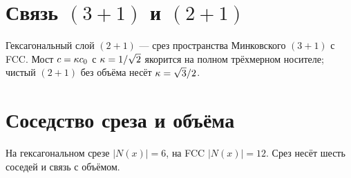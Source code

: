 \section{Связь $(3{+}1)$ и $(2{+}1)$}

Гексагональный слой $(2{+}1)$ --- срез пространства Минковского $(3{+}1)$ с FCC.
Мост $c=\kappa c_0$ с $\kappa=1/\sqrt{2}$ якорится на полном трёхмерном носителе;
чистый $(2{+}1)$ без объёма несёт $\kappa=\sqrt{3}/2$.

\section{Соседство среза и объёма}

На гексагональном срезе $|N(x)|=6$, на FCC $|N(x)|=12$.
Срез несёт шесть соседей и связь с объёмом.

